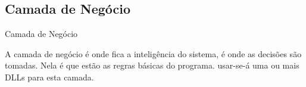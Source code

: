 	
	\subsection{Camada de Negócio}

	\begin{frame}
	
	\begin{CaixaModelo01}{Camada de Negócio}
	
		A camada de negócio é onde fica a inteligência do sistema, é onde as decisões são tomadas.
		Nela é que estão as regras básicas do programa.
		\newline
		\newline
		usar-se-á uma ou mais DLLs para esta camada. 

	\end{CaixaModelo01}
	
	\end{frame}
